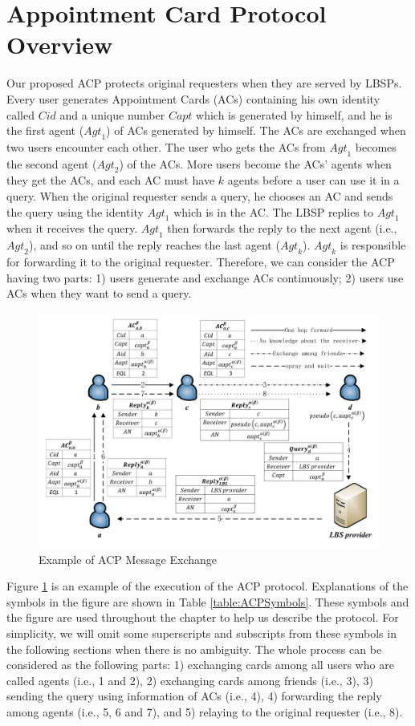\section{Appointment Card Protocol Overview}

\noindent Our proposed ACP protects original requesters when they are served by LBSPs. Every user generates Appointment Cards (ACs) containing his own identity called $Cid$ and a unique number $Capt$ which is generated by himself, and he is the first agent (${Agt}_{1}$) of ACs generated by himself. The ACs are exchanged when two users encounter each other. The user who gets the ACs from ${Agt}_{1}$ becomes the second agent (${Agt}_{2}$) of the ACs. More users become the ACs' agents when they get the ACs, and each AC must have $k$ agents before a user can use it in a query. When the original requester sends a query, he chooses an AC and sends the query using the identity ${Agt}_{1}$ which is in the AC. The LBSP replies to ${Agt}_{1}$ when it receives the query. ${Agt}_{1}$ then forwards the reply to the next agent (i.e., ${Agt}_{2}$), and so on until the reply reaches the last agent (${Agt}_{k}$). ${Agt}_{k}$ is responsible for forwarding it to the original requester. Therefore, we can consider the ACP having two parts: 1) users generate and exchange ACs continuously; 2) users use ACs when they want to send a query.

\begin{figure} [H]
\centering 
\includegraphics[width=6.0in]{figures/FIG_4_1_Example_of_ACP_Message_Exchange.png}
\caption{Example of ACP Message Exchange} 
\label{fig:EoACPME}
\end{figure}


Figure \ref{fig:EoACPME} is an example of the execution of the ACP protocol. Explanations of the symbols in the figure are shown in Table \ref{table:ACPSymbols}. These symbols and the figure are used throughout the chapter to help us describe the protocol. For simplicity, we will omit some superscripts and subscripts from these symbols in the following sections when there is no ambiguity. The whole process can be considered as the following parts: 1) exchanging cards among all users who are called agents (i.e., 1 and 2), 2) exchanging cards among friends (i.e., 3), 3) sending the query using information of ACs (i.e., 4), 4) forwarding the reply among agents (i.e., 5, 6 and 7), and 5) relaying to the original requester (i.e., 8). 


